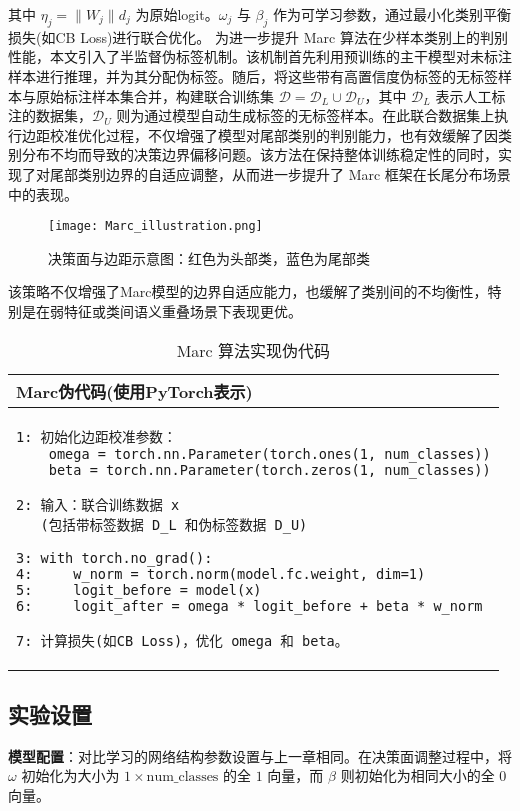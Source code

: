 \documentclass[master]{thesis-uestc}
\begin{document}
其中 $\eta_j = \|W_j\| d_j$ 为原始logit。$\omega_j$ 与 $\beta_j$ 作为可学习参数，通过最小化类别平衡损失(如CB Loss)进行联合优化。
为进一步提升 Marc 算法在少样本类别上的判别性能，本文引入了半监督伪标签机制。该机制首先利用预训练的主干模型对未标注样本进行推理，并为其分配伪标签。随后，将这些带有高置信度伪标签的无标签样本与原始标注样本集合并，构建联合训练集 $\mathcal{D} = \mathcal{D}_L \cup \mathcal{D}_U$，其中 $\mathcal{D}_L$ 表示人工标注的数据集，$\mathcal{D}_U$ 则为通过模型自动生成标签的无标签样本。在此联合数据集上执行边距校准优化过程，不仅增强了模型对尾部类别的判别能力，也有效缓解了因类别分布不均而导致的决策边界偏移问题。该方法在保持整体训练稳定性的同时，实现了对尾部类别边界的自适应调整，从而进一步提升了 Marc 框架在长尾分布场景中的表现。

\begin{figure}[H]
    \centering
    \texttt{[image: Marc\_illustration.png]}
    \caption{决策面与边距示意图：红色为头部类，蓝色为尾部类}
    \label{Marc_illustration}
\end{figure}
该策略不仅增强了Marc模型的边界自适应能力，也缓解了类别间的不均衡性，特别是在弱特征或类间语义重叠场景下表现更优。

\begin{table}[h]
    \centering
    {
    \begin{tabular}{@{}l@{}}
    \toprule
    \textbf{Marc伪代码(使用PyTorch表示)} \\
    \midrule
    \begin{lstlisting}[basicstyle=\fontspec{Times New Roman}, frame=none]
1: 初始化边距校准参数：
    omega = torch.nn.Parameter(torch.ones(1, num_classes))
    beta = torch.nn.Parameter(torch.zeros(1, num_classes))

2: 输入：联合训练数据 x 
   (包括带标签数据 D_L 和伪标签数据 D_U)

3: with torch.no_grad():
4:     w_norm = torch.norm(model.fc.weight, dim=1)
5:     logit_before = model(x)
6:     logit_after = omega * logit_before + beta * w_norm

7: 计算损失(如CB Loss)，优化 omega 和 beta。
    \end{lstlisting} \\
    \bottomrule
    \end{tabular}
    }
    \caption{{Marc 算法实现伪代码}}
    \label{alg:Marc}
\end{table}


\subsection{实验设置}
\textbf{模型配置}：对比学习的网络结构参数设置与上一章相同。在决策面调整过程中，将 $\omega$ 初始化为大小为 $1 \times \text{num\_classes}$ 的全 $1$ 向量，而 $\beta$ 则初始化为相同大小的全 $0$ 向量。
\end{document}
